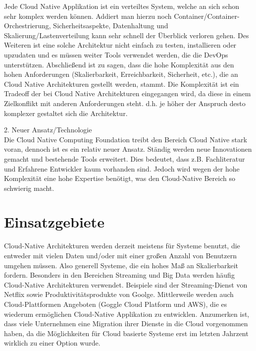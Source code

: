 Jede Cloud Native Applikation ist ein verteiltes System, welche an sich schon sehr komplex werden können. Addiert man hierzu noch Container/Container-Orchestrierung, Sicherheitsaspekte, Datenhaltung und Skalierung/Lastenverteilung kann sehr schnell der Überblick verloren gehen. Des Weiteren ist eine solche Architektur nicht einfach zu testen, installieren oder upzudaten und es müssen weiter Tools verwendet werden, die die DevOps unterstützen.
Abschließend ist zu sagen, dass die hohe Komplexität aus den hohen Anforderungen (Skalierbarkeit, Erreichbarkeit, Sicherheit, etc.), die an Cloud Native Architekturen gestellt werden, stammt. Die Komplexität ist ein Tradeoff der bei Cloud Native Architekturen eingegangen wird, da diese in einem Zielkonflikt mit anderen Anforderungen steht. d.h. je höher der Anspruch desto komplexer gestaltet sich die Architektur.


2. Neuer Ansatz/Technologie\\
Die Cloud Native Computing Foundation treibt den Bereich Cloud Native stark voran, dennoch ist es ein relativ neuer Ansatz. Ständig werden neue Innovationen gemacht und bestehende Tools erweitert. Dies bedeutet, dass z.B. Fachliteratur und Erfahrene Entwickler kaum vorhanden sind. Jedoch wird wegen der hohe Komplexität eine hohe Expertise benötigt, was den Cloud-Native Bereich so schwierig macht.

\section{Einsatzgebiete}
Cloud-Native Architekturen werden derzeit meistens für Systeme benutzt, die entweder mit vielen Daten und/oder mit einer großen Anzahl von Benutzern umgehen müssen. Also generell Systeme, die ein hohes Maß an Skalierbarkeit fordern. Besonders in den Bereichen Streaming und Big Data werden häufig Cloud-Native Architekturen verwendet. 
Beispiele sind der Streaming-Dienst von Netflix sowie Produktivitätsprodukte von Goolge. Mittlerweile werden auch Cloud-Plattformen Angeboten (Goggle Cloud Platform und AWS), die es wiederum ermöglichen Cloud-Native Applikation zu entwicklen.
Anzumerken ist, dass viele Unternehmen eine Migration ihrer Dienste in die Cloud vorgenommen haben, da die Möglichkeiten für Cloud basierte Systeme erst im letzten Jahrzent wirklich zu einer Option wurde.